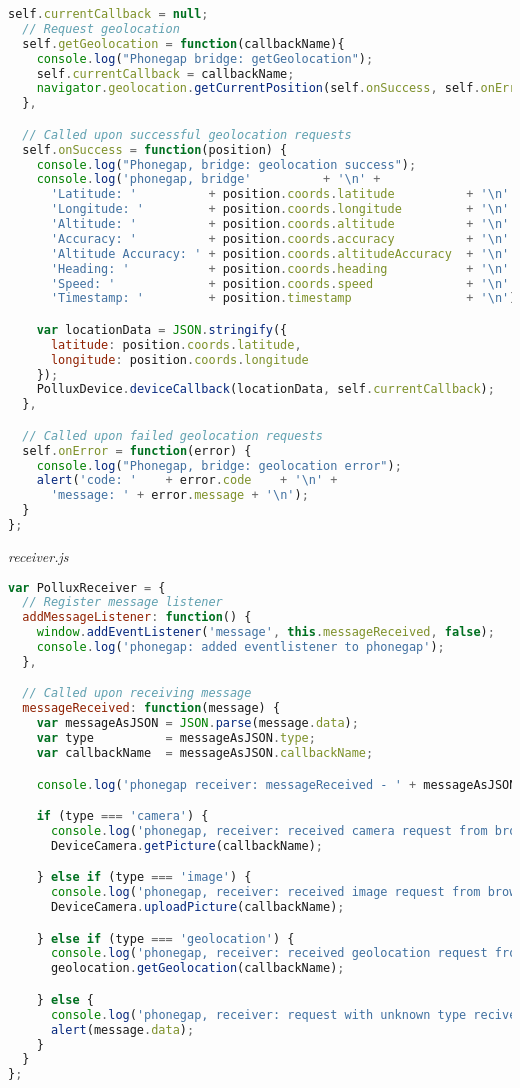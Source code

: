 \begin{lstlisting}[language=JavaScript]
  self.currentCallback = null;
  // Request geolocation
  self.getGeolocation = function(callbackName){
    console.log("Phonegap bridge: getGeolocation");
    self.currentCallback = callbackName;
    navigator.geolocation.getCurrentPosition(self.onSuccess, self.onError, {timeout: 10000});
  },

  // Called upon successful geolocation requests
  self.onSuccess = function(position) {
    console.log("Phonegap, bridge: geolocation success");
    console.log('phonegap, bridge'          + '\n' +
      'Latitude: '          + position.coords.latitude          + '\n' +
      'Longitude: '         + position.coords.longitude         + '\n' +
      'Altitude: '          + position.coords.altitude          + '\n' +
      'Accuracy: '          + position.coords.accuracy          + '\n' +
      'Altitude Accuracy: ' + position.coords.altitudeAccuracy  + '\n' +
      'Heading: '           + position.coords.heading           + '\n' +
      'Speed: '             + position.coords.speed             + '\n' +
      'Timestamp: '         + position.timestamp                + '\n');

    var locationData = JSON.stringify({
      latitude: position.coords.latitude,
      longitude: position.coords.longitude
    });
    PolluxDevice.deviceCallback(locationData, self.currentCallback);
  },

  // Called upon failed geolocation requests
  self.onError = function(error) {
    console.log("Phonegap, bridge: geolocation error");
    alert('code: '    + error.code    + '\n' +
      'message: ' + error.message + '\n');
  }
};
\end{lstlisting}
\emph{receiver.js}
\begin{lstlisting}[language=JavaScript]
var PolluxReceiver = {
  // Register message listener
  addMessageListener: function() {
    window.addEventListener('message', this.messageReceived, false);
    console.log('phonegap: added eventlistener to phonegap');
  },

  // Called upon receiving message
  messageReceived: function(message) {
    var messageAsJSON = JSON.parse(message.data);
    var type          = messageAsJSON.type;
    var callbackName  = messageAsJSON.callbackName;

    console.log('phonegap receiver: messageReceived - ' + messageAsJSON);

    if (type === 'camera') {
      console.log('phonegap, receiver: received camera request from browser');
      DeviceCamera.getPicture(callbackName);

    } else if (type === 'image') {
      console.log('phonegap, receiver: received image request from browser');
      DeviceCamera.uploadPicture(callbackName);

    } else if (type === 'geolocation') {
      console.log('phonegap, receiver: received geolocation request from browser');
      geolocation.getGeolocation(callbackName);

    } else {
      console.log('phonegap, receiver: request with unknown type recived');
      alert(message.data);
    }
  }
};
\end{lstlisting}

